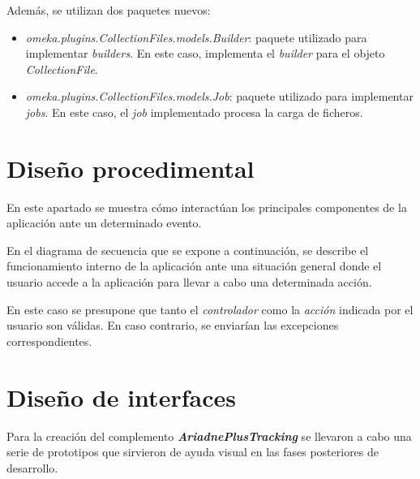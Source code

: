 Además, se utilizan dos paquetes nuevos:

\begin{itemize}
\tightlist
\item
  \emph{omeka.plugins.CollectionFiles.models.Builder}: paquete utilizado
  para implementar \emph{builders}. En este caso, implementa el
  \emph{builder} para el objeto \emph{CollectionFile}.
\item
  \emph{omeka.plugins.CollectionFiles.models.Job}: paquete utilizado
  para implementar \emph{jobs}. En este caso, el \emph{job} implementado
  procesa la carga de ficheros.
\end{itemize}



\section{Diseño procedimental}

En este apartado se muestra cómo interactúan los principales componentes
de la aplicación ante un determinado evento.

En el diagrama de secuencia que se expone a continuación, se describe el
funcionamiento interno de la aplicación ante una situación general donde
el usuario accede a la aplicación para llevar a cabo una determinada
acción.


En este caso se presupone que tanto el \emph{controlador} como la
\emph{acción} indicada por el usuario son válidas. En caso contrario, se
enviarían las excepciones correspondientes.

\section{Diseño de interfaces}

Para la creación del complemento \textbf{\emph{AriadnePlusTracking}} se llevaron
a cabo una serie de prototipos que sirvieron de ayuda visual en las
fases posteriores de desarrollo.







